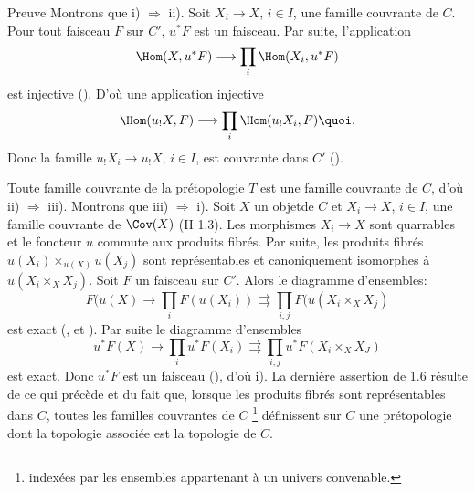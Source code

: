 \begin{enonce*}[remark]{Preuve}
Montrons que i) $\Rightarrow$ ii). Soit $X_i\rightarrow X$, $i\in
I$, une famille couvrante de $C$. Pour tout faisceau $F$ sur $C'$,
$u^\ast F$ est un faisceau. Par suite, l'application
$$
\Hom(X,u^\ast F)\longrightarrow \prod_i\Hom(X_i,u^\ast F)
$$
est injective (). D'où une application injective
$$
\Hom(u_{!}X,F)\longrightarrow \prod_i \Hom(u_{!}X_i, F){\quoi}.
$$
Donc la famille $u_{!}X_i\rightarrow u_{!}X$, $i\in I$, est
couvrante dans $C'$ ().

Toute famille couvrante de la prétopologie $T$ est une famille
couvrante de $C$, d'où ii) $\Rightarrow$ iii). Montrons que iii)
$\Rightarrow$ i). Soit $X$ un objet\pageoriginale de $C$ et
$X_i\rightarrow X$, $i\in I$, une famille couvrante de $\Cov(X)$ (II
1.3). Les morphismes $X_i\rightarrow X$ sont quarrables et le
foncteur $u$ commute aux produits fibrés. Par suite, les
produits fibrés $u(X_i)\times_{u(X)} u(X_j)$ sont
représentables et canoniquement isomorphes à $u(X_i\times_X
X_j)$. Soit $F$ un faisceau sur $C'$. Alors le diagramme
d'ensembles:
$$
F(u(X)\rightarrow \prod_i F(u(X_i))\rightrightarrows
\prod_{i,j}F(u(X_i\times_X X_j)
$$
est exact (,  et ). Par
suite le diagramme d'ensembles
$$
u^\ast F(X)\rightarrow \prod_i u^\ast F(X_i)\rightrightarrows
\prod_{i,j}u^\ast F(X_i\times_X X_J)
$$
est exact. Donc $u^\ast F$ est un faisceau (), d'où
i). La dernière assertion de \hyperref[III.prop1.6]{1.6} résulte de ce
qui précède et du fait que, lorsque les produits fibrés
sont représentables dans $C$, toutes les familles couvrantes de
$C$ \footnote[1]{indexées par les
  ensembles appartenant à un univers convenable.} définissent sur
$C$ une prétopologie dont la topologie associée est la
topologie de $C$.
\end{enonce*}

